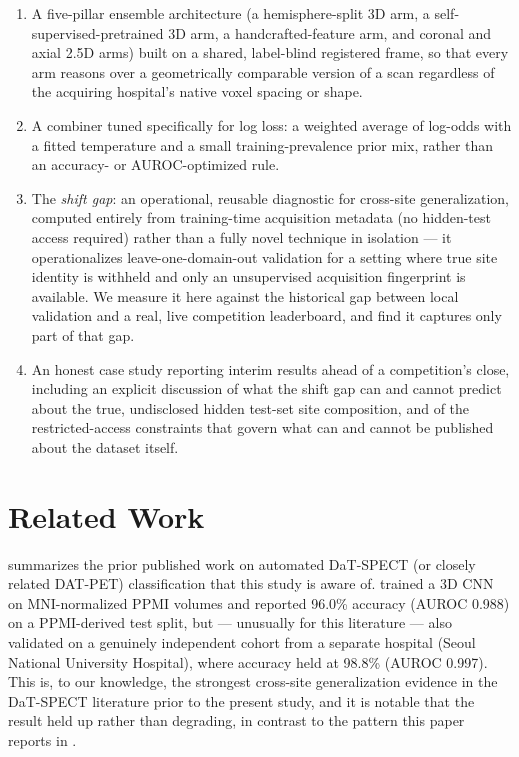 \documentclass[11pt]{article}
\begin{document}
\begin{enumerate}[leftmargin=*]
\item A five-pillar ensemble architecture (a hemisphere-split 3D arm, a self-supervised-pretrained 3D arm, a handcrafted-feature arm, and coronal and axial 2.5D arms) built on a shared, label-blind registered frame, so that every arm reasons over a geometrically comparable version of a scan regardless of the acquiring hospital's native voxel spacing or shape.
\item A combiner tuned specifically for log loss: a weighted average of log-odds with a fitted temperature and a small training-prevalence prior mix, rather than an accuracy- or AUROC-optimized rule.
\item The \emph{shift gap}: an operational, reusable diagnostic for cross-site generalization, computed entirely from training-time acquisition metadata (no hidden-test access required) rather than a fully novel technique in isolation --- it operationalizes leave-one-domain-out validation for a setting where true site identity is withheld and only an unsupervised acquisition fingerprint is available. We measure it here against the historical gap between local validation and a real, live competition leaderboard, and find it captures only part of that gap.
\item An honest case study reporting interim results ahead of a competition's close, including an explicit discussion of what the shift gap can and cannot predict about the true, undisclosed hidden test-set site composition, and of the restricted-access constraints that govern what can and cannot be published about the dataset itself.
\end{enumerate}

\section{Related Work}
\label{sec:related}

 summarizes the prior published work on automated DaT-SPECT (or closely related DAT-PET) classification that this study is aware of. \citet{choi2017} trained a 3D CNN on MNI-normalized PPMI volumes and reported 96.0\% accuracy (AUROC 0.988) on a PPMI-derived test split, but --- unusually for this literature --- also validated on a genuinely independent cohort from a separate hospital (Seoul National University Hospital), where accuracy held at 98.8\% (AUROC 0.997). This is, to our knowledge, the strongest cross-site generalization evidence in the DaT-SPECT literature prior to the present study, and it is notable that the result held up rather than degrading, in contrast to the pattern this paper reports in .
\end{document}

